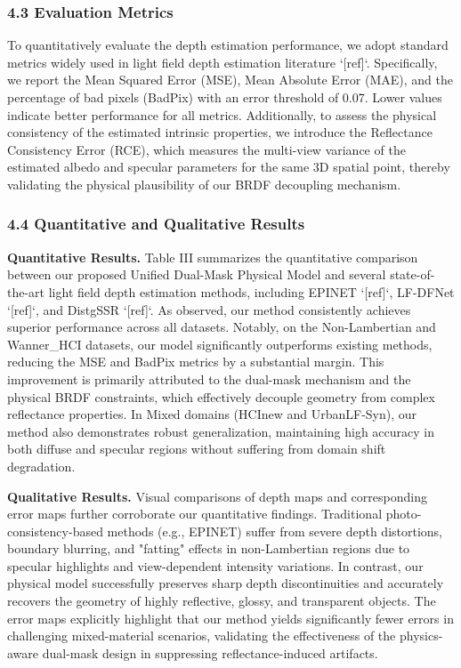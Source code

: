 \documentclass[journal]{IEEEtran}
\begin{document}
\subsubsection{4.3 Evaluation Metrics}

To quantitatively evaluate the depth estimation performance, we adopt standard metrics widely used in light field depth estimation literature `[ref]`. Specifically, we report the Mean Squared Error (MSE), Mean Absolute Error (MAE), and the percentage of bad pixels (BadPix) with an error threshold of 0.07. Lower values indicate better performance for all metrics. Additionally, to assess the physical consistency of the estimated intrinsic properties, we introduce the Reflectance Consistency Error (RCE), which measures the multi-view variance of the estimated albedo and specular parameters for the same 3D spatial point, thereby validating the physical plausibility of our BRDF decoupling mechanism.

\subsubsection{4.4 Quantitative and Qualitative Results}

\textbf{Quantitative Results.} 
Table III summarizes the quantitative comparison between our proposed Unified Dual-Mask Physical Model and several state-of-the-art light field depth estimation methods, including EPINET `[ref]`, LF-DFNet `[ref]`, and DistgSSR `[ref]`. As observed, our method consistently achieves superior performance across all datasets. Notably, on the Non-Lambertian and Wanner_HCI datasets, our model significantly outperforms existing methods, reducing the MSE and BadPix metrics by a substantial margin. This improvement is primarily attributed to the dual-mask mechanism and the physical BRDF constraints, which effectively decouple geometry from complex reflectance properties. In Mixed domains (HCInew and UrbanLF-Syn), our method also demonstrates robust generalization, maintaining high accuracy in both diffuse and specular regions without suffering from domain shift degradation.

\textbf{Qualitative Results.} 
Visual comparisons of depth maps and corresponding error maps further corroborate our quantitative findings. Traditional photo-consistency-based methods (e.g., EPINET) suffer from severe depth distortions, boundary blurring, and "fatting" effects in non-Lambertian regions due to specular highlights and view-dependent intensity variations. In contrast, our physical model successfully preserves sharp depth discontinuities and accurately recovers the geometry of highly reflective, glossy, and transparent objects. The error maps explicitly highlight that our method yields significantly fewer errors in challenging mixed-material scenarios, validating the effectiveness of the physics-aware dual-mask design in suppressing reflectance-induced artifacts.
\end{document}
